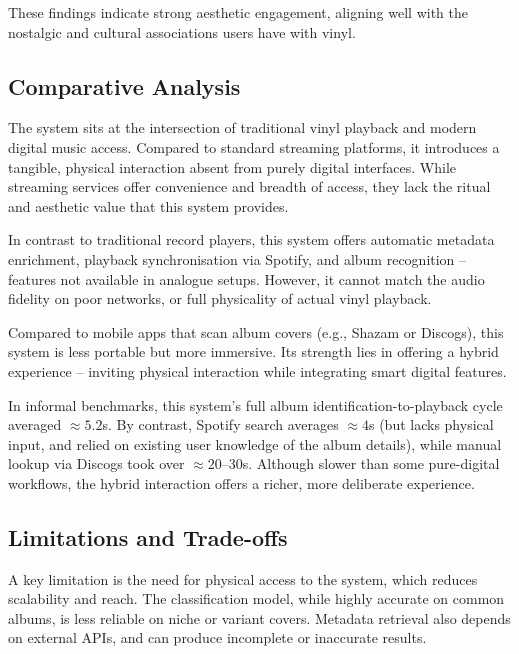                 These findings indicate strong aesthetic engagement, aligning well with the nostalgic and cultural associations users have with vinyl.
            
        \subsection{Comparative Analysis}
            
            The system sits at the intersection of traditional vinyl playback and modern digital music access. Compared to standard streaming platforms, it introduces a tangible, physical interaction absent from purely digital interfaces. While streaming services offer convenience and breadth of access, they lack the ritual and aesthetic value that this system provides.
    
            In contrast to traditional record players, this system offers automatic metadata enrichment, playback synchronisation via Spotify, and album recognition -- features not available in analogue setups. However, it cannot match the audio fidelity on poor networks, or full physicality of actual vinyl playback.
            
            Compared to mobile apps that scan album covers (e.g., Shazam or Discogs), this system is less portable but more immersive. Its strength lies in offering a hybrid experience -- inviting physical interaction while integrating smart digital features.
    
            In informal benchmarks, this system's full album identification-to-playback cycle averaged $\approx 5.2$s. By contrast, Spotify search averages $\approx 4$s (but lacks physical input, and relied on existing user knowledge of the album details), while manual lookup via Discogs took over $\approx 20–30$s. Although slower than some pure-digital workflows, the hybrid interaction offers a richer, more deliberate experience.
    
        \subsection{Limitations and Trade-offs}
    
            A key limitation is the need for physical access to the system, which reduces scalability and reach. The classification model, while highly accurate on common albums, is less reliable on niche or variant covers. Metadata retrieval also depends on external APIs, and can produce incomplete or inaccurate results.
    

